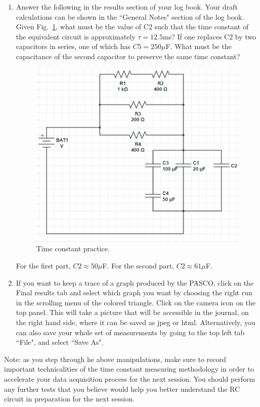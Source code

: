\documentclass[12pt]{report}
\begin{document}
\begin{enumerate}
\item {\color{blue}Answer the following in the results section of your log book.} Your draft calculations can be shown in the ``General Notes" section of the log book. Given Fig.~\ref{Fig:lab2-session1-tau-practice}, what must be the value of C2 such that the time constant of the equivalent circuit is approximately $\tau=12.5$ms?
If one replaces C2 by two capacitors in series, one of which has $C5=250\mu$F. What must be the capacitance of the second capacitor to preserve the same time constant?
\begin{figure}[h]
\centering
\includegraphics[width=0.6\linewidth]{lab2-session1-Cpractice}
\caption{Time constant practice.}
\label{Fig:lab2-session1-tau-practice}
\end{figure}

\begin{tcolorbox}[title=Answer]
For the first part, $C2 \approx 50\mu$F. For the second part, $C2 \approx 61\mu$F.
\end{tcolorbox}

\item If you want to keep a trace of a graph produced by the PASCO, click on the Final results tab and select which graph you want by choosing the right run in the scrolling menu of the colored triangle. 
Click on the camera icon on the top panel. This will take a picture that will be accessible in the journal, on the right hand side, where it can be saved as jpeg or html. 
Alternatively, you can also save your whole set of measurements by going to the top left tab ``File", and select ``Save As".
\end{enumerate}

Note: as you step through he above manipulations, make sure to record important technicalities of the time constant measuring methodology in order to accelerate your data acquisition process for the next session. 
You should perform any further tests that you believe would help you better understand the RC circuit in preparation for the next session.
\end{document}
